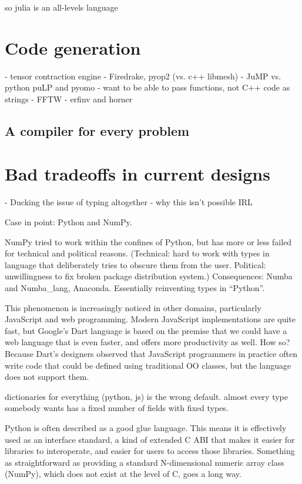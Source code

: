 {so julia is an all-levels language


\section{Code generation}

- tensor contraction engine
- Firedrake, pyop2 (vs. c++ libmesh)
- JuMP vs. python puLP and pyomo
  - want to be able to pass functions, not C++ code as strings
- FFTW
- erfinv and horner

\subsection{A compiler for every problem}


\section{Bad tradeoffs in current designs}


- Ducking the issue of typing altogether - why this isn't possible IRL

Case in point: Python and NumPy.

NumPy tried to work within the confines of Python, but has more or
less failed for technical and political reasons. (Technical: hard
to work with types in language that deliberately tries to obscure
them from the user. Political: unwillingness to fix broken package
distribution system.) Consequences: Numba and Numba\_lang, Anaconda.
Essentially reinventing types in ``Python''. 

This phenomenon is increasingly noticed in other domains, particularly
JavaScript and web programming. Modern JavaScript implementations are
quite fast, but Google's Dart language is based on the premise that
we could have a web language that is even faster, and offers more
productivity as well. How so? Because Dart's designers observed that
JavaScript programmers in practice often write code that could be
defined using traditional OO classes, but the language does not
support them.

dictionaries for everything (python, js) is the wrong default. almost every
type somebody wants has a fixed number of fields with fixed types.

Python is often described as a good glue language. This
means it is effectively used as an interface standard, a kind of
extended C ABI that makes it easier for libraries to interoperate,
and easier for users to access those libraries. Something as straightforward
as providing a standard N-dimensional numeric array class (NumPy),
which does not exist at the level of C, goes a long way.

}
